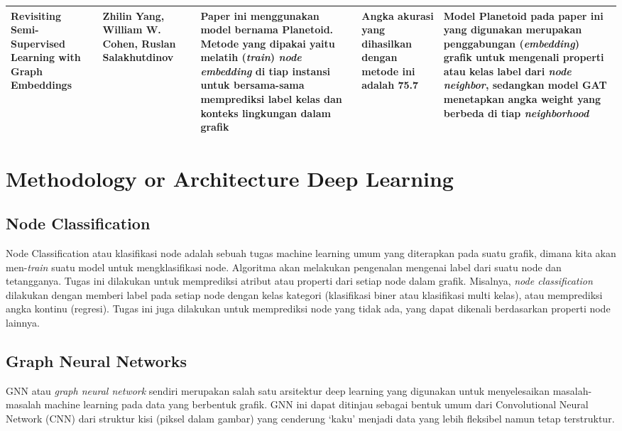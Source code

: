 \documentclass{article}
\begin{document}
\begin{center}
\begin{tabular}{m{3cm}|m{3cm}|m{3cm}|m{3cm}|m{3cm}}
\hline
\textbf{Revisiting Semi-Supervised Learning with Graph Embeddings\cite{cite21}} & \textbf{Zhilin Yang, William W. Cohen, Ruslan Salakhutdinov} & \textbf{Paper ini menggunakan model bernama Planetoid. Metode yang dipakai yaitu melatih (\textit{train}) \textit{node embedding} di tiap instansi  untuk bersama-sama memprediksi label kelas dan konteks lingkungan dalam grafik} & \textbf{Angka akurasi yang dihasilkan dengan metode ini adalah 75.7} & \textbf{Model Planetoid pada paper ini yang digunakan merupakan penggabungan (\textit{embedding}) grafik untuk mengenali properti atau kelas label dari \textit{node neighbor}, sedangkan model GAT menetapkan angka weight yang berbeda di tiap \textit{neighborhood}} \\ \hline
\end{tabular}
\end{center}

\section{Methodology or Architecture Deep Learning}
\subsection{Node Classification}
Node Classification atau klasifikasi node adalah sebuah tugas machine learning umum yang diterapkan pada suatu grafik, dimana kita akan men-\textit{train} suatu model untuk mengklasifikasi node. Algoritma akan melakukan pengenalan mengenai label dari suatu node dan tetangganya. 
Tugas ini dilakukan untuk memprediksi atribut atau properti dari setiap node dalam grafik. Misalnya, \textit{node classification} dilakukan dengan memberi label pada setiap node dengan kelas kategori (klasifikasi biner atau klasifikasi multi kelas), atau memprediksi angka kontinu (regresi). Tugas ini juga dilakukan untuk memprediksi node yang tidak ada, yang dapat dikenali berdasarkan properti node lainnya.

\subsection{Graph Neural Networks}
GNN atau \textit{graph neural network} sendiri merupakan salah satu arsitektur deep learning yang digunakan untuk menyelesaikan masalah-masalah machine learning pada data yang berbentuk grafik. GNN ini dapat ditinjau sebagai bentuk umum dari Convolutional Neural Network (CNN) dari struktur kisi (piksel dalam gambar) yang cenderung ‘kaku’ menjadi data yang lebih fleksibel namun tetap terstruktur.
\end{document}
